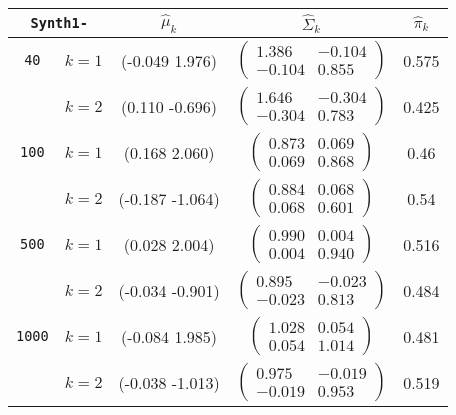 \documentclass{article}
\begin{document}
\begin{multicols}{2}
\begin{center}
{\footnotesize
\begin{tabular}{|@{}c@{}|@{}c@{}||@{}c@{}|@{}c@{}|c|}
\hline
\multicolumn{2}{|c|}{\texttt{Synth1-}} & $\widehat{\mu}_k$ & $\widehat{\Sigma}_k$ & $\widehat{\pi}_k$  \\
\hline
\hline
\texttt{40} & $k=1$ & (-0.049  1.976) & $\begin{pmatrix}
    1.386 & -0.104 \\
   -0.104 & 0.855
\end{pmatrix}$
  & 0.575 \\
\cline{2-3}
 & $k=2$  & (0.110 -0.696) & $\begin{pmatrix}
   1.646 & -0.304 \\
  -0.304 & 0.783
\end{pmatrix}$ & 0.425 \\
\hline
\hline
\texttt{100} & $k=1$ & (0.168 2.060) & $\begin{pmatrix}
   0.873 & 0.069 \\
   0.069 & 0.868 
\end{pmatrix}$
  & 0.46 \\
\cline{2-3}
 & $k=2$  & (-0.187 -1.064) & $\begin{pmatrix}
  0.884 & 0.068 \\
  0.068 & 0.601
\end{pmatrix}$ & 0.54 \\
\hline
\hline
\texttt{500} & $k=1$ & (0.028 2.004) & $\begin{pmatrix}
   0.990 & 0.004 \\
   0.004 & 0.940 
\end{pmatrix}$
  & 0.516 \\
\cline{2-3}
 & $k=2$  & (-0.034 -0.901) & $\begin{pmatrix}
   0.895 & -0.023 \\
   -0.023 & 0.813
\end{pmatrix}$ & 0.484 \\
\hline
\hline
\texttt{1000} & $k=1$ & (-0.084  1.985) & $\begin{pmatrix}
   1.028 & 0.054 \\
   0.054 & 1.014
\end{pmatrix}$
  & 0.481 \\
\cline{2-3}
 & $k=2$  & (-0.038 -1.013) & $\begin{pmatrix}
  0.975 & -0.019 \\
  -0.019 & 0.953 
\end{pmatrix}$ & 0.519 \\ 
\hline
\end{tabular}
}
\end{center}


\end{multicols}
\end{document}
